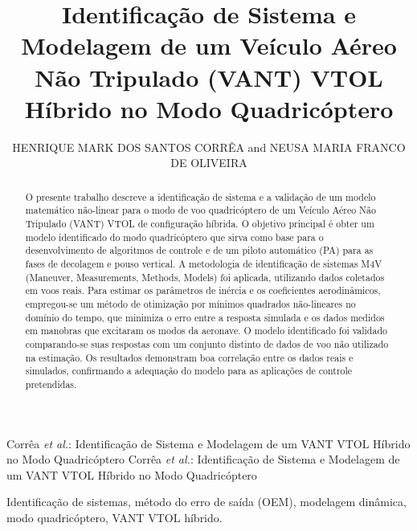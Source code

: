 \documentclass{ieeeaccess}
\begin{document}
\history{}
\doi{}

\title{Identificação de Sistema e Modelagem de um Veículo Aéreo Não Tripulado (VANT) VTOL Híbrido no Modo Quadricóptero}

\author{\uppercase{Henrique Mark dos Santos Corrêa} and
\uppercase{Neusa Maria Franco de Oliveira}}

\address[1]{Departamento de Engenharia Eletrônica (IEE), Instituto Tecnológico de Aeronáutica (ITA), São José dos Campos, SP 12228-900, Brazil (e-mail: henriquecorrea@ita.br; neusa@ita.br)}


\markboth
{Corrêa \MakeLowercase{\textit{et al.}}: Identificação de Sistema e Modelagem de um VANT VTOL Híbrido no Modo Quadricóptero}
{Corrêa \MakeLowercase{\textit{et al.}}: Identificação de Sistema e Modelagem de um VANT VTOL Híbrido no Modo Quadricóptero}


\begin{abstract}
O presente trabalho descreve a identificação de sistema e a validação de um modelo matemático não-linear para o modo de voo quadricóptero de um Veículo Aéreo Não Tripulado (VANT) VTOL de configuração híbrida. O objetivo principal é obter um modelo identificado do modo quadricóptero que sirva como base para o desenvolvimento de algoritmos de controle e de um piloto automático (PA) para as fases de decolagem e pouso vertical. A metodologia de identificação de sistemas M4V (Maneuver, Measurements, Methods, Models) foi aplicada, utilizando dados coletados em voos reais. Para estimar os parâmetros de inércia e os coeficientes aerodinâmicos, empregou-se um método de otimização por mínimos quadrados não-lineares no domínio do tempo, que minimiza o erro entre a resposta simulada e os dados medidos em manobras que excitaram os modos da aeronave. O modelo identificado foi validado comparando-se suas respostas com um conjunto distinto de dados de voo não utilizado na estimação. Os resultados demonstram boa correlação entre os dados reais e simulados, confirmando a adequação do modelo para as aplicações de controle pretendidas.
\end{abstract}

\begin{keywords}
Identificação de sistemas, método do erro de saída (OEM), modelagem dinâmica, modo quadricóptero, VANT VTOL híbrido.
\end{keywords}
\end{document}
